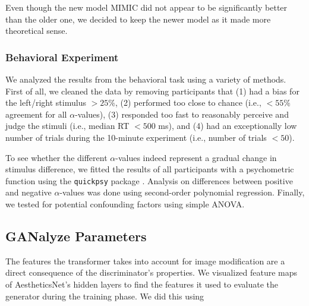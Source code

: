 \documentclass[../main.tex]{subfiles}
\begin{document}
	Even though the new model MIMIC did not appear to be significantly better than the older one, we decided to keep the newer model as it made more theoretical sense.
	
	
	
	\subsubsection{Behavioral Experiment}
	We analyzed the results from the behavioral task using a variety of methods. First of all, we cleaned the data by removing participants that (1) had a bias for the left/right stimulus $>25\%$, (2) performed too close to chance (i.e., $<55\%$ agreement for all $\alpha$-values), (3) responded too fast to reasonably perceive and judge the stimuli (i.e., median RT $<500$ ms), and (4) had an exceptionally low number of trials during the 10-minute experiment (i.e., number of trials $<50$).
	
	To see whether the different $\alpha$-values indeed represent a gradual change in stimulus difference, we fitted the results of all participants with a psychometric function using the \texttt{quickpsy} package \parencite{linares2016quickpsy}. Analysis on differences between positive and negative $\alpha$-values was done using second-order polynomial regression. Finally, we tested for potential confounding factors using simple ANOVA.
	
	
	
	\subsection{GANalyze Parameters}
	The features the transformer takes into account for image modification are a direct consequence of the discriminator's properties. We visualized feature maps of AestheticsNet's hidden layers to find the features it used to evaluate the generator during the training phase. We did this using 
\end{document}
